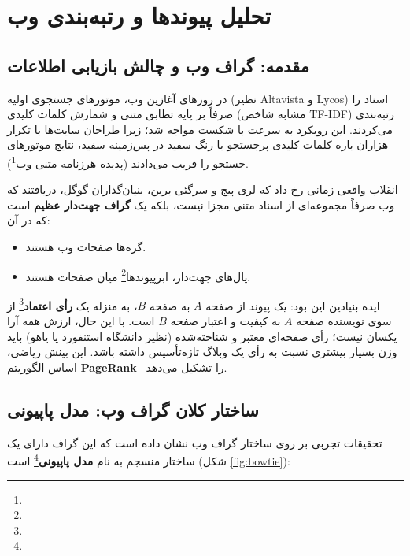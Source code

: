 \chapter{تحلیل پیوندها و رتبه‌بندی وب \texorpdfstring{}{(Link Analysis \& PageRank)}}
\label{ch:link-analysis}

\section{مقدمه: گراف وب و چالش بازیابی اطلاعات}
در روزهای آغازین وب، موتورهای جستجوی اولیه (نظیر Altavista و Lycos) اسناد را صرفاً بر پایه تطابق متنی و شمارش کلمات کلیدی (مشابه شاخص TF-IDF) رتبه‌بندی می‌کردند. این رویکرد به سرعت با شکست مواجه شد؛ زیرا طراحان سایت‌ها با تکرار هزاران باره کلمات کلیدی پرجستجو با رنگ سفید در پس‌زمینه سفید، نتایج موتورهای جستجو را فریب می‌دادند (پدیده هرزنامه متنی وب\footnote{}).

انقلاب واقعی زمانی رخ داد که لری پیج و سرگئی برین، بنیان‌گذاران گوگل، دریافتند که وب صرفاً مجموعه‌ای از اسناد متنی مجزا نیست، بلکه یک \textbf{گراف جهت‌دار عظیم} است که در آن:
\begin{itemize}
    \item گره‌ها صفحات وب هستند.
    \item یال‌های جهت‌دار، ابرپیوندها\footnote{} میان صفحات هستند.
\end{itemize}

ایده بنیادین این بود: یک پیوند از صفحه $A$ به صفحه $B$، به منزله یک \textbf{رأی اعتماد}\footnote{} از سوی نویسنده صفحه $A$ به کیفیت و اعتبار صفحه $B$ است. با این حال، ارزش همه آرا یکسان نیست؛ رأی صفحه‌ای معتبر و شناخته‌شده (نظیر دانشگاه استنفورد یا یاهو) باید وزن بسیار بیشتری نسبت به رأی یک وبلاگ تازه‌تأسیس داشته باشد. این بینش ریاضی، اساس الگوریتم \textbf{PageRank}~\cite{page1999pagerank} را تشکیل می‌دهد.

\section{ساختار کلان گراف وب: مدل پاپیونی \texorpdfstring{}{(Bow-Tie Model)}}
تحقیقات تجربی بر روی ساختار گراف وب نشان داده است که این گراف دارای یک ساختار منسجم به نام \textbf{مدل پاپیونی}\footnote{} است (شکل \ref{fig:bowtie}):

